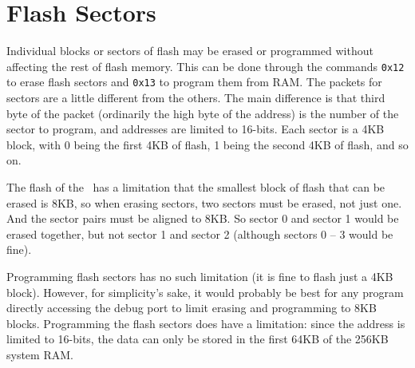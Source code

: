 \section{Flash Sectors}
Individual blocks or sectors of flash may be erased or programmed without affecting the rest of flash memory. This can be done through the commands \verb+0x12+ to erase flash sectors and \verb+0x13+ to program them from RAM. The packets for sectors are a little different from the others. The main difference is that third byte of the packet (ordinarily the high byte of the address) is the number of the sector to program, and addresses are limited to 16-bits. Each sector is a 4KB block, with 0 being the first 4KB of flash, 1 being the second 4KB of flash, and so on.

The flash of the \jr\ has a limitation that the smallest block of flash that can be erased is 8KB, so when erasing sectors, two sectors must be erased, not just one. And the sector pairs must be aligned to 8KB. So sector 0 and sector 1 would be erased together, but not sector 1 and sector 2 (although sectors 0 -- 3 would be fine).

Programming flash sectors has no such limitation (it is fine to flash just a 4KB block). However, for simplicity's sake, it would probably be best for any program directly accessing the debug port to limit erasing and programming to 8KB blocks. Programming the flash sectors does have a limitation: since the address is limited to 16-bits, the data can only be stored in the first 64KB of the 256KB system RAM.
